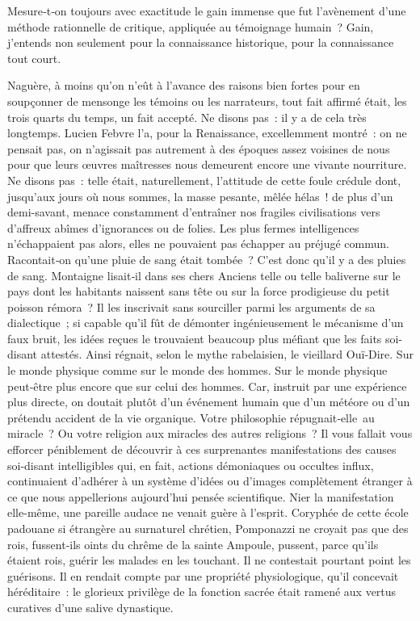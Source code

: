 \documentclass[french,twoside]{book} %
\newcommand{\astermono}{\medskip\centerline{\color{rubric}\large\selectfont{\syms ✻}}\medskip\par}%
\begin{document}
\astermono

\noindent Mesure‑t‑on toujours avec exactitude le gain immense que fut l’avènement d’une méthode rationnelle de critique, appliquée au témoignage humain ? Gain, j’entends non seulement pour la connaissance historique, pour la connaissance tout court.\par
Naguère, à moins qu’on n’eût à l’avance des raisons bien fortes pour en soupçonner de mensonge les témoins ou les narrateurs, tout fait affirmé était, les trois quarts du temps, un fait accepté. Ne disons pas : il y a de cela très longtemps. Lucien Febvre l’a, pour la Renaissance, excellemment montré : on ne pensait pas, on n’agissait pas autrement à des époques assez voisines de nous pour que leurs œuvres maîtresses nous demeurent encore une vivante nourriture. Ne disons pas : telle était, naturellement, l’attitude de cette foule crédule dont, jusqu’aux jours où nous sommes, la masse pesante, mêlée hélas ! de plus d’un demi-savant, menace cons­tamment d’entraîner nos fragiles civilisations vers d’affreux abîmes d’igno­rances ou de folies. Les plus fermes intelligences n’échappaient pas alors, elles ne pouvaient pas échapper au préjugé commun. Racontait‑on qu’une pluie de sang était tombée ? C’est donc qu’il y a des pluies de sang. Mon­taigne lisait‑il dans ses chers Anciens telle ou telle baliverne sur le pays dont les habitants naissent sans tête ou sur la force prodigieuse du petit poisson rémora ? Il les inscrivait sans sourciller parmi les arguments de sa dialectique ; si capable qu’il fût de démonter ingénieusement le méca­nisme d’un faux bruit, les idées reçues le trouvaient beaucoup plus méfiant que les faits soi-disant attestés. Ainsi régnait, selon le mythe rabelaisien, le vieillard Ouï‑Dire. Sur le monde physique comme sur le monde des hommes. Sur le monde physique peut‑être plus encore que sur celui des hommes. Car, instruit par une expérience plus directe, on doutait plutôt d’un événement humain que d’un météore ou d’un prétendu accident de la vie organique. Votre philosophie répugnait‑elle au miracle ? Ou votre religion aux miracles des autres religions ? Il vous fallait vous efforcer  
\label{p66} péniblement de découvrir à ces surprenantes manifestations des causes soi-disant intelligibles qui, en fait, actions démoniaques ou occultes influx, continuaient d’adhérer à un système d’idées ou d’images complètement étranger à ce que nous appellerions aujourd’hui pensée scientifique. Nier la manifestation elle-même, une pareille audace ne venait guère à l’esprit. Coryphée de cette école padouane si étrangère au surnaturel chrétien, Pomponazzi ne croyait pas que des rois, fussent‑ils oints du chrême de la sainte Ampoule, pussent, parce qu’ils étaient rois, guérir les malades en les touchant. Il ne contestait pourtant point les guérisons. Il en rendait compte par une propriété physiologique, qu’il concevait héréditaire : le glorieux privilège de la fonction sacrée était ramené aux vertus curatives d’une salive dynastique.\par
\end{document}
